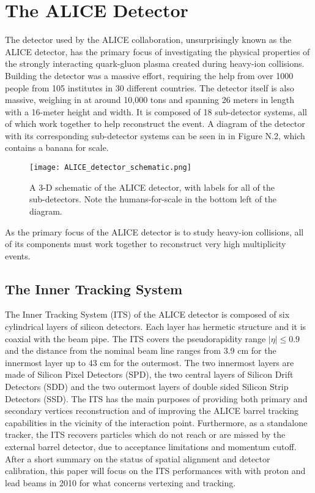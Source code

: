 \section{The ALICE Detector}
The detector used by the ALICE collaboration, unsurprisingly known as the ALICE detector, has the primary focus of investigating the physical properties of the strongly interacting quark-gluon plasma created during heavy-ion collisions.
Building the detector was a massive effort, requiring the help from over 1000 people from 105 institutes in 30 different countries. 
The detector itself is also massive, weighing in at around 10,000 tons and spanning 26 meters in length with a 16-meter height and width.
It is composed of 18 sub-detector systems, all of which work together to help reconstruct the event.
A diagram of the detector with its corresponding sub-detector systems can be seen in in Figure N.2, which contains a banana for scale.
\begin{figure}
    \centering
    \texttt{[image: ALICE\_detector\_schematic.png]}
    \caption{A 3-D schematic of the ALICE detector, with labels for all of the sub-detectors. Note the humans-for-scale in the bottom left of the diagram.}
    \label{fig:my_label}
\end{figure}
As the primary focus of the ALICE detector is to study heavy-ion collisions, all of its components must work together to reconstruct very high multiplicity events. 

\subsection{The Inner Tracking System}
The Inner Tracking System (ITS) of the ALICE detector is composed of six cylindrical layers of silicon detectors.
Each layer has hermetic structure and it is coaxial with the beam pipe.
The ITS covers the pseudorapidity range $|\eta| \leq 0.9$ and the distance from the nominal beam line ranges from 3.9 cm for the innermost layer up to 43 cm for the outermost.
The two innermost layers are made of Silicon Pixel Detectors (SPD), the two central layers of Silicon Drift Detectors (SDD) and the two outermost layers of double sided Silicon Strip Detectors (SSD).
The ITS has the main purposes of providing both primary and secondary vertices reconstruction and of improving the ALICE barrel tracking capabilities in the vicinity of the interaction point.
Furthermore, as a standalone tracker, the ITS recovers particles which do not reach or are missed by the external barrel detector, due to acceptance limitations and momentum cutoff.
After a short summary on the status of spatial alignment and detector calibration, this paper will focus on the ITS performances with with proton and lead beams in 2010 for what concerns vertexing and tracking.
